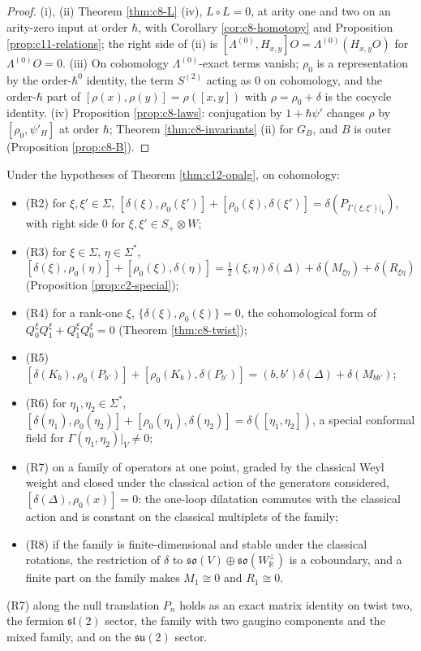 \begin{proof}
(i), (ii) Theorem \ref{thm:c8-L} (iv), $L\circ L=0$, at arity one and two on an arity-zero input at order $\hbar$, with Corollary \ref{cor:c8-homotopy} and Proposition \ref{prop:c11-relations}; the right side of (ii) is $[\Lambda^{(0)},H_{x,y}]O=\Lambda^{(0)}(H_{x,y}O)$ for $\Lambda^{(0)}O=0$. (iii) On cohomology $\Lambda^{(0)}$-exact terms vanish; $\rho_0$ is a representation by the order-$\hbar^0$ identity, the term $S^{(2)}$ acting as $0$ on cohomology, and the order-$\hbar$ part of $[\rho(x),\rho(y)]=\rho([x,y])$ with $\rho=\rho_0+\delta$ is the cocycle identity. (iv) Proposition \ref{prop:c8-laws}: conjugation by $1+\hbar\psi'$ changes $\rho$ by $[\rho_0,\psi'_H]$ at order $\hbar$; Theorem \ref{thm:c8-invariants} (ii) for $G_B$, and $B$ is outer (Proposition \ref{prop:c8-B}).
\end{proof}

\begin{corollary}
\label{cor:c12-rel}
Under the hypotheses of Theorem \ref{thm:c12-opalg}, on cohomology:
\begin{itemize}
\item (R2) for $\xi,\xi'\in\Sigma$, $[\delta(\xi),\rho_0(\xi')]+[\rho_0(\xi),\delta(\xi')]=\delta(P_{\Gamma(\xi,\xi')|_V})$, with right side $0$ for $\xi,\xi'\in S_+\otimes W$;
\item (R3) for $\xi\in\Sigma$, $\eta\in\Sigma^*$, $[\delta(\xi),\rho_0(\eta)]+[\rho_0(\xi),\delta(\eta)]=\tfrac12(\xi,\eta)\delta(\Delta)+\delta(M_{\xi\eta})+\delta(R_{\xi\eta})$ (Proposition \ref{prop:c2-special});
\item (R4) for a rank-one $\xi$, $\{\delta(\xi),\rho_0(\xi)\}=0$, the cohomological form of $Q^\xi_0Q^\xi_1+Q^\xi_1Q^\xi_0=0$ (Theorem \ref{thm:c8-twist});
\item (R5) $[\delta(K_b),\rho_0(P_{b'})]+[\rho_0(K_b),\delta(P_{b'})]=(b,b')\delta(\Delta)+\delta(M_{bb'})$;
\item (R6) for $\eta_1,\eta_2\in\Sigma^*$, $[\delta(\eta_1),\rho_0(\eta_2)]+[\rho_0(\eta_1),\delta(\eta_2)]=\delta([\eta_1,\eta_2])$, a special conformal field for $\Gamma(\eta_1,\eta_2)|_V\neq0$;
\item (R7) on a family of operators at one point, graded by the classical Weyl weight and closed under the classical action of the generators considered, $[\delta(\Delta),\rho_0(x)]=0$: the one-loop dilatation commutes with the classical action and is constant on the classical multiplets of the family;
\item (R8) if the family is finite-dimensional and stable under the classical rotations, the restriction of $\delta$ to $\mathfrak{so}(V)\oplus\mathfrak{so}(W_{\mathbb R}^\perp)$ is a coboundary, and a finite part on the family makes $M_1\cong0$ and $R_1\cong0$.
\end{itemize}
(R7) along the null translation $P_n$ holds as an exact matrix identity on twist two, the fermion $\mathfrak{sl}(2)$ sector, the family with two gaugino components and the mixed family, and on the $\mathfrak{su}(2)$ sector.
\end{corollary}

